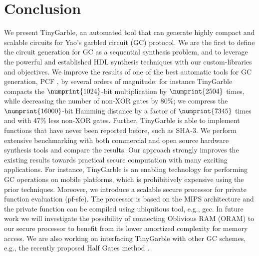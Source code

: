 \chapter{Conclusion}
We present TinyGarble, an automated tool that can generate highly compact and scalable circuits for Yao's garbled circuit (GC) protocol.
We are the first to define the circuit generation for GC as a sequential synthesis problem, and to leverage the powerful and established HDL synthesis techniques with our custom-libraries and objectives.
We improve the results of one of the best automatic tools for GC generation, PCF \cite{kreuter2013pcf}, by several orders of magnitude: for instance TinyGarble compacts the $\numprint{1024}$-bit multiplication by $\numprint{2504}$ times, while decreasing the number of non-XOR gates by 80\%; we compress the $\numprint{16000}$-bit Hamming distance by a factor of $\numprint{7345}$ times and with 47\% less non-XOR gates.
Further, TinyGarble is able to implement functions that have never been reported before, such as SHA-3.
We perform extensive benchmarking with both commercial and open source hardware synthesis tools and compare the results.
Our approach strongly improves the existing results towards practical secure computation with many exciting applications.
For instance, TinyGarble is an enabling technology for performing GC operations on mobile platforms, which is prohibitively expensive using the prior techniques.
Moreover, we introduce a scalable secure processor for private function evaluation (\acrshort{pf-sfe}).
The processor is based on the MIPS architecture and the private function can be compiled using ubiquitous tool, e.g., gcc.
In future work we will investigate the possibility of connecting Oblivious RAM (ORAM) to our secure processor to benefit from its lower amortized complexity for memory access.
We are also working on interfacing TinyGarble with other GC schemes, e.g., the recently proposed Half Gates method \cite{zahur2015two}.
